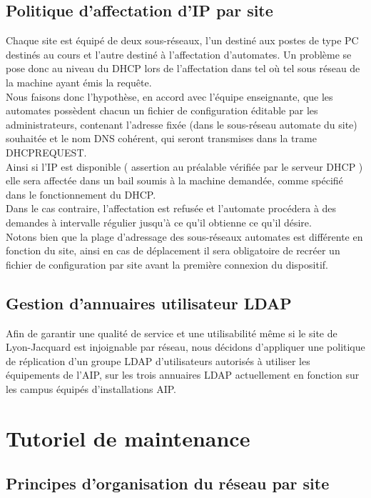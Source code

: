 \documentclass[a4paper]{article}
\begin{document}
\subsection{Politique d'affectation d'IP par site}

Chaque site est équipé de deux sous-réseaux, l'un destiné aux postes de type PC destinés au cours et l'autre destiné à l'affectation d'automates. Un problème se pose donc au niveau du DHCP lors de l'affectation dans tel où tel sous réseau de la machine ayant émis la requête.\\
Nous faisons donc l'hypothèse, en accord avec l'équipe enseignante, que les automates possèdent chacun un fichier de configuration éditable par les administrateurs, contenant l'adresse fixée (dans le sous-réseau automate du site) souhaitée et le nom DNS cohérent, qui seront transmises dans la trame DHCPREQUEST.\\
Ainsi si l'IP est disponible ( assertion au préalable vérifiée par le serveur DHCP ) elle sera affectée dans un bail soumis à la machine demandée, comme spécifié dans le fonctionnement du DHCP.\\
Dans le cas contraire, l'affectation est refusée et l'automate procédera à des demandes à intervalle régulier jusqu'à ce qu'il obtienne ce qu'il désire.\\
Notons bien que la plage d'adressage des sous-réseaux automates est différente en fonction du site, ainsi en cas de déplacement il sera obligatoire de recréer un fichier de configuration par site avant la première connexion du dispositif. 

\subsection{Gestion d'annuaires utilisateur LDAP}

Afin de garantir une qualité de service et une utilisabilité même si le site de Lyon-Jacquard est injoignable par réseau, nous décidons d'appliquer une politique de réplication d'un groupe LDAP d'utilisateurs autorisés à utiliser les équipements de l'AIP, sur les trois annuaires LDAP actuellement en fonction sur les campus équipés d'installations AIP.

\section{Tutoriel de maintenance}

\subsection{Principes d'organisation du réseau par site}
\end{document}
